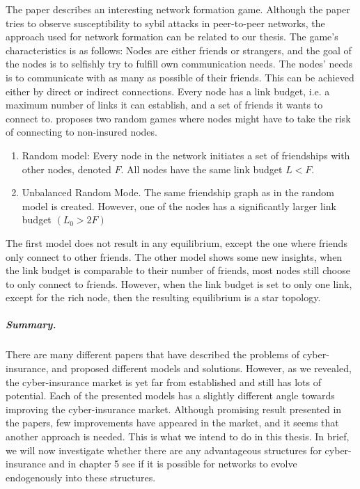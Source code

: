 The paper \cite{danezis2006network} describes an interesting network formation game. Although the paper tries to observe susceptibility to sybil attacks in peer-to-peer networks, the approach used for network formation can be related to our thesis. The game's characteristics is as follows: Nodes are either friends or strangers, and the goal of the nodes is to selfishly try to fulfill own communication needs. The nodes' needs is to communicate with as many as possible of their friends. This can be achieved either by direct or indirect connections. Every node has a link budget, i.e. a maximum number of links it can establish, and a set of friends it wants to connect to. 
\cite{danezis2006network} proposes two random games where nodes might have to take the risk of connecting to non-insured nodes.
\begin{enumerate}
\item Random model: Every node in the network initiates a set of friendships with other nodes, denoted $F$. All nodes have the same link budget $L<F$. 
\item Unbalanced Random Mode. The same friendship graph as in the random model is created. However, one of the nodes has a significantly larger link budget $(L_{0} > 2 F)$
\end{enumerate}
The first model does not result in any equilibrium, except the one where friends only connect to other friends.
The other model shows some new insights, when the link budget is comparable to their number of friends, most nodes still choose to only connect to friends. However, when the link budget is set to only one link, except for the rich node, then the resulting equilibrium is a star topology. 

\subparagraph{Summary.}
There are many different papers that have described the problems of cyber-insurance, and proposed different models and solutions. However, as we revealed, the cyber-insurance market is yet far from established and still has lots of potential. Each of the presented models has a slightly different angle towards improving the cyber-insurance market. Although promising result presented in the papers, few improvements have appeared in the market, and it seems that another approach is needed. This is what we intend to do in this thesis. In brief, we will now investigate whether there are any advantageous structures for cyber-insurance and in chapter 5 see if it is possible for networks to evolve endogenously into these structures.  

